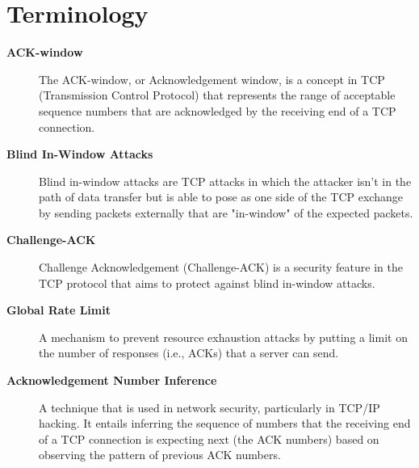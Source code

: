\documentclass[letterpaper,12pt]{report}
\begin{document}
\clearpage
{}
\settableofcontents
\tableofcontents
\clearpage


\newpage
\section*{\Large {Terminology}}

\begin{description}
\item[\textbf{ ACK-window}] \begin{sloppypar}The ACK-window, or Acknowledgement window, is a concept in TCP (Transmission Control Protocol) that represents the range of acceptable sequence numbers that are acknowledged by the receiving end of a TCP connection.\end{sloppypar}

\item[\textbf{ Blind In-Window Attacks}] \begin{sloppypar}Blind in-window attacks are TCP attacks in which the attacker isn't in the path of data transfer but is able to pose as one side of the TCP exchange by sending packets externally that are "in-window" of the expected packets.\end{sloppypar}

\item[\textbf{ Challenge-ACK}] \begin{sloppypar}Challenge Acknowledgement (Challenge-ACK) is a security feature in the TCP protocol that aims to protect against blind in-window attacks.\end{sloppypar}

\item[\textbf{ Global Rate Limit}] \begin{sloppypar}A mechanism to prevent resource exhaustion attacks by putting a limit on the number of responses (i.e., ACKs) that a server can send.\end{sloppypar}

\item[\textbf{ Acknowledgement Number Inference}] \begin{sloppypar}A technique that is used in network security, particularly in TCP/IP hacking. It entails inferring the sequence of numbers that the receiving end of a TCP connection is expecting next (the ACK numbers) based on observing the pattern of previous ACK numbers.\end{sloppypar}
\end{description}
\normalsize
\end{document}
